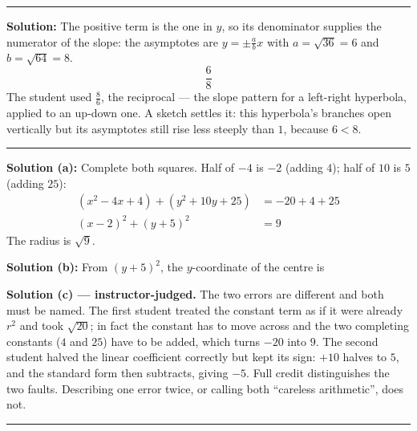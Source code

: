 \documentclass[12pt]{article}
\begin{document}
\vspace{0.2cm}\noindent\rule{\linewidth}{0.2pt}


\textbf{Solution:} The positive term is the one in $y$, so its denominator supplies the
numerator of the slope: the asymptotes are $y = \pm\frac{a}{b}x$ with $a = \sqrt{36} = 6$ and
$b = \sqrt{64} = 8$.
\[ \frac{6}{8} \]
The student used $\frac{8}{6}$, the reciprocal --- the slope pattern for a left-right
hyperbola, applied to an up-down one. A sketch settles it: this hyperbola's branches open
vertically but its asymptotes still rise less steeply than $1$, because $6 < 8$.

\vspace{0.2cm}\noindent\rule{\linewidth}{0.2pt}


\textbf{Solution (a):} Complete both squares. Half of $-4$ is $-2$ (adding $4$); half of $10$
is $5$ (adding $25$):
\begin{align*}
  (x^2 - 4x + 4) + (y^2 + 10y + 25) &= -20 + 4 + 25 \\
  (x - 2)^2 + (y + 5)^2 &= 9
\end{align*}
The radius is $\sqrt{9}$. 

\textbf{Solution (b):} From $(y + 5)^2$, the $y$-coordinate of the centre is 

\vspace{0.15cm}
\textbf{Solution (c) --- instructor-judged.} The two errors are different and both must be
named. The first student treated the constant term as if it were already $r^2$ and took
$\sqrt{20}$; in fact the constant has to move across and the two completing constants
($4$ and $25$) have to be added, which turns $-20$ into $9$. The second student halved the
linear coefficient correctly but kept its sign: $+10$ halves to $5$, and the standard form
then subtracts, giving $-5$. Full credit distinguishes the two faults. Describing one error
twice, or calling both ``careless arithmetic'', does not.

\vspace{0.2cm}\noindent\rule{\linewidth}{0.2pt}
\end{document}
